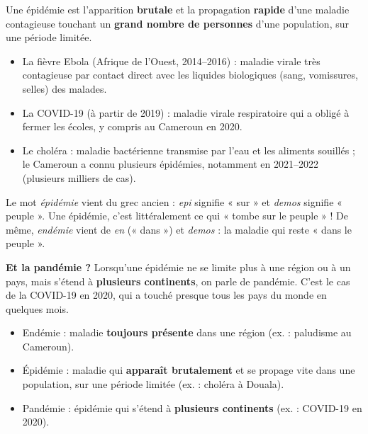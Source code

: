\documentclass[11pt]{article}
\newcommand{\cle}[1]{{\popxbold\color{popdark}#1}}
\begin{document}
\begin{definition}[Épidémie]
Une \cle{épidémie} est l'apparition \textbf{brutale} et la propagation \textbf{rapide} d'une maladie contagieuse touchant un \textbf{grand nombre de personnes} d'une population, sur une période limitée.
\end{definition}

\begin{exemplebox}
\begin{itemize}
\item La \cle{fièvre Ebola} (Afrique de l'Ouest, 2014--2016) : maladie virale très contagieuse par contact direct avec les liquides biologiques (sang, vomissures, selles) des malades.
\item La \cle{COVID-19} (à partir de 2019) : maladie virale respiratoire qui a obligé à fermer les écoles, y compris au Cameroun en 2020.
\item Le \cle{choléra} : maladie bactérienne transmise par l'eau et les aliments souillés ; le Cameroun a connu plusieurs épidémies, notamment en 2021--2022 (plusieurs milliers de cas).
\end{itemize}
\end{exemplebox}

\begin{savaistu}
Le mot \emph{épidémie} vient du grec ancien : \emph{epi} signifie « sur » et \emph{demos} signifie « peuple ». Une épidémie, c'est littéralement ce qui « tombe sur le peuple » ! De même, \emph{endémie} vient de \emph{en} (« dans ») et \emph{demos} : la maladie qui reste « dans le peuple ».
\end{savaistu}

\textbf{Et la pandémie ?} Lorsqu'une épidémie ne se limite plus à une région ou à un pays, mais s'étend à \textbf{plusieurs continents}, on parle de \cle{pandémie}. C'est le cas de la COVID-19 en 2020, qui a touché presque tous les pays du monde en quelques mois.

\begin{aretenir}
\begin{itemize}
\item \cle{Endémie} : maladie \textbf{toujours présente} dans une région (ex. : paludisme au Cameroun).
\item \cle{Épidémie} : maladie qui \textbf{apparaît brutalement} et se propage vite dans une population, sur une période limitée (ex. : choléra à Douala).
\item \cle{Pandémie} : épidémie qui s'étend à \textbf{plusieurs continents} (ex. : COVID-19 en 2020).
\end{itemize}
\end{aretenir}
\end{document}
